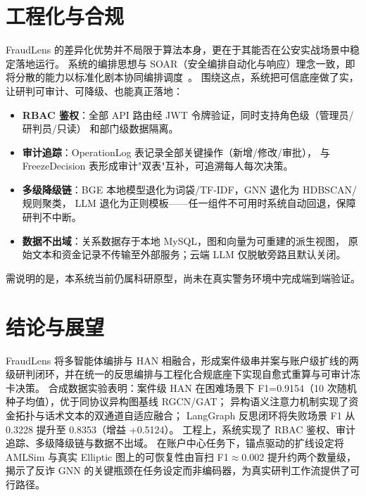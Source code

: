 \documentclass[12pt,a4paper]{ctexart}
\begin{document}
\section{工程化与合规}

FraudLens 的差异化优势并不局限于算法本身，更在于其能否在公安实战场景中稳定落地运行。
系统的编排思想与 SOAR（安全编排自动化与响应）理念一致，即将分散的能力以标准化剧本协同编排调度~\cite{hua2025soar,shu2022soar}。
围绕这点，系统把可信底座做了实，让研判可审计、可降级、也能真正落地：
\begin{itemize}
  \item \textbf{RBAC 鉴权}：全部 API 路由经 JWT 令牌验证，同时支持角色级（管理员/研判员/只读）
    和部门级数据隔离。
  \item \textbf{审计追踪}：OperationLog 表记录全部关键操作（新增/修改/审批），
    与 FreezeDecision 表形成审计"双表"互补，可追溯每人每次决策。
  \item \textbf{多级降级链}：BGE 本地模型退化为词袋/TF-IDF，GNN 退化为 HDBSCAN/规则聚类，
    LLM 退化为正则模板——任一组件不可用时系统自动回退，保障研判不中断。
  \item \textbf{数据不出域}：关系数据存于本地 MySQL，图和向量为可重建的派生视图，
    原始文本和资金记录不传输至外部服务；云端 LLM 仅脱敏旁路且默认关闭。
\end{itemize}

需说明的是，本系统当前仍属科研原型，尚未在真实警务环境中完成端到端验证。

\section{结论与展望}

FraudLens 将多智能体编排与 HAN 相融合，形成案件级串并案与账户级扩线的两级研判闭环，并在统一的反思编排与工程化合规底座下实现自愈式重算与可审计冻卡决策。
合成数据实验表明：案件级 HAN 在困难场景下 F1=0.9154（10 次随机种子均值），优于同协议异构图基线 RGCN/GAT；
异构语义注意力机制实现了资金拓扑与话术文本的双通道自适应融合；
LangGraph 反思闭环将失败场景 F1 从 0.3228 提升至 0.8353（增益 +0.5124）。
工程上，系统实现了 RBAC 鉴权、审计追踪、多级降级链与数据不出域。
在账户中心任务下，锚点驱动的扩线设定将 AMLSim 与真实 Elliptic 图上的可恢复性由盲扫 F1$\approx$0.002 提升约两个数量级，
揭示了反诈 GNN 的关键瓶颈在任务设定而非编码器，为真实研判工作流提供了可行路径。
\end{document}
